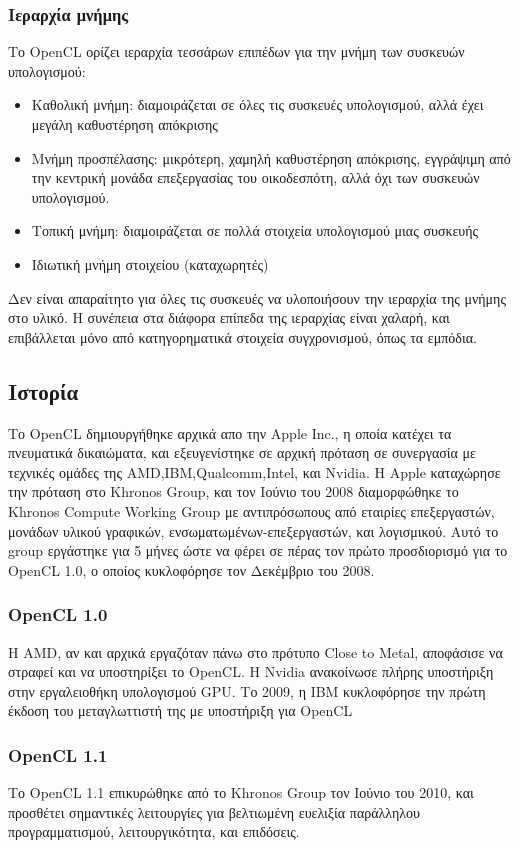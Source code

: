\subsubsection{Ιεραρχία μνήμης}
Το OpenCL ορίζει ιεραρχία τεσσάρων επιπέδων για την μνήμη των συσκευών υπολογισμού:
\begin{itemize}
\item Καθολική μνήμη: διαμοιράζεται σε όλες τις συσκευές υπολογισμού, αλλά έχει μεγάλη καθυστέρηση απόκρισης
\item Μνήμη προσπέλασης: μικρότερη, χαμηλή καθυστέρηση απόκρισης, εγγράψιμη από την κεντρική μονάδα επεξεργασίας του οικοδεσπότη, αλλά όχι των συσκευών υπολογισμού.
\item Τοπική μνήμη: διαμοιράζεται σε πολλά στοιχεία υπολογισμού μιας συσκευής
\item Ιδιωτική μνήμη στοιχείου (καταχωρητές) 
\end{itemize}   
Δεν είναι απαραίτητο για όλες τις συσκευές να υλοποιήσουν την ιεραρχία της μνήμης στο υλικό. Η συνέπεια στα διάφορα επίπεδα της ιεραρχίας είναι χαλαρή, και επιβάλλεται μόνο από κατηγορηματικά στοιχεία συγχρονισμού, όπως τα εμπόδια.
\subsection{Ιστορία}
Το OpenCL δημιουργήθηκε αρχικά απο την Apple Inc., η οποία κατέχει τα πνευματικά δικαιώματα, και εξευγενίστηκε σε αρχική πρόταση σε συνεργασία με τεχνικές ομάδες της AMD,IBM,Qualcomm,Intel, και Nvidia. Η Apple καταχώρησε την πρόταση στο Khronos Group, και τον Ιούνιο του 2008 διαμορφώθηκε το Khronos Compute Working Group με αντιπρόσωπους από εταιρίες επεξεργαστών, μονάδων υλικού γραφικών, ενσωματωμένων-επεξεργαστών, και λογισμικού. Αυτό το group εργάστηκε για 5 μήνες ώστε να φέρει σε πέρας τον πρώτο προσδιορισμό για το OpenCL 1.0, ο οποίος κυκλοφόρησε τον Δεκέμβριο του 2008. 
\subsubsection{OpenCL 1.0} Η AMD, αν και αρχικά εργαζόταν πάνω στο πρότυπο Close to Metal, αποφάσισε να στραφεί και να υποστηρίξει το OpenCL. Η Nvidia ανακοίνωσε πλήρης υποστήριξη στην εργαλειοθήκη υπολογισμού GPU. Το 2009, η IBM κυκλοφόρησε την πρώτη έκδοση του μεταγλωττιστή της με υποστήριξη για OpenCL
\subsubsection{OpenCL 1.1} Το OpenCL 1.1 επικυρώθηκε από το Khronos Group τον Ιούνιο του 2010, και προσθέτει σημαντικές λειτουργίες για βελτιωμένη ευελιξία παράλληλου προγραμματισμού, λειτουργικότητα, και επιδόσεις.
